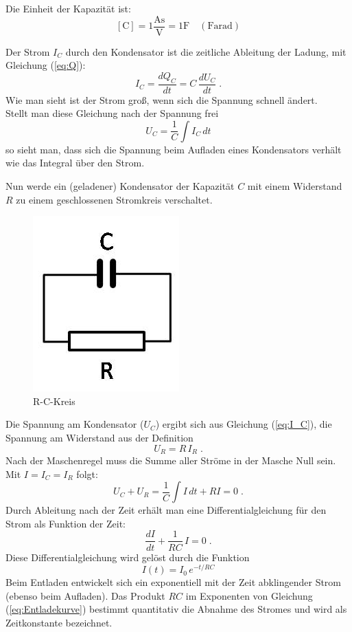 \noindent
Die Einheit der Kapazität ist:
\begin{equation}
 \mathrm{\left[C\right] = 1\frac{As}{V} = 1 F \quad (Farad)}
\end{equation}

\noindent
Der Strom $I_C$ durch den Kondensator ist die zeitliche Ableitung der Ladung, mit Gleichung (\ref{eq:Q}):
\begin{equation}
 I_C = \frac{dQ_C}{dt} = C\,\frac{dU_C}{dt}\; .
 \label{eq:I_C}
\end{equation}
Wie man sieht ist der Strom groß, wenn sich die Spannung schnell ändert.\\
Stellt man diese Gleichung nach der Spannung frei
\begin{equation}
 U_C = \frac{1}{C}\int{I_C\, dt}
\end{equation}
so sieht man, dass sich die Spannung beim Aufladen eines Kondensators verhält wie das Integral über den Strom.

Nun werde ein (geladener) Kondensator der Kapazität $C$ mit einem Widerstand $R$ zu einem geschlossenen Stromkreis verschaltet.
\begin{figure}[h]
	\centering
		\includegraphics[width=.1\textwidth]{Versuch_15-16/Abbildungen/RC-Kreis.jpg}
	\caption{R-C-Kreis}
	\label{fig:RC-Kreis}
\end{figure}
Die Spannung am Kondensator ($U_C$) ergibt sich aus Gleichung (\ref{eq:I_C}), die Spannung am Widerstand aus der Definition
\begin{equation}
 U_R = R\, I_R\; .
\end{equation}
Nach der Maschenregel muss die Summe aller Ströme in der Masche Null sein. Mit $I = I_C = I_R$ folgt:
\begin{equation}
 U_C + U_R = \frac{1}{C}\int{I\, dt} + R I = 0\; .
\end{equation}
Durch Ableitung nach der Zeit erhält man eine Differentialgleichung für den Strom als Funktion der Zeit:
\begin{equation}
 \frac{dI}{dt} + \frac{1}{RC}\,I = 0\; .
\end{equation}
Diese Differentialgleichung wird gelöst durch die Funktion
\begin{equation}
 I(t) = I_0\, e^{-t/RC}
 \label{eq:Entladekurve}
\end{equation}
Beim Entladen entwickelt sich ein exponentiell mit der Zeit abklingender Strom (ebenso beim Aufladen). Das Produkt $RC$ im Exponenten von Gleichung (\ref{eq:Entladekurve}) bestimmt quantitativ die Abnahme des Stromes und wird als Zeitkonstante bezeichnet.\\


